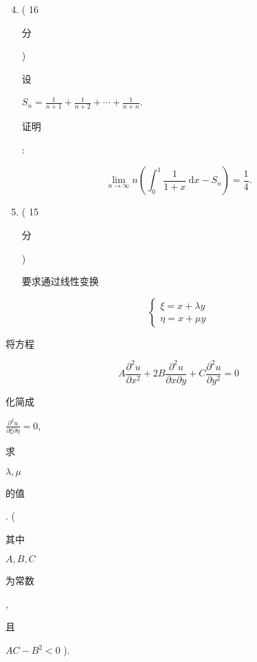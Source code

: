 \documentclass[10pt]{article}
\begin{document}
\begin{enumerate}
  \setcounter{enumi}{3}
  \item ( 16 \begin{CJK}{UTF8}{mj}分\end{CJK}) \begin{CJK}{UTF8}{mj}设\end{CJK} $S_{n}=\frac{1}{n+1}+\frac{1}{n+2}+\cdots+\frac{1}{n+n}$. \begin{CJK}{UTF8}{mj}证明\end{CJK}:
\end{enumerate}
$$
\lim _{n \rightarrow \infty} n\left(\int_{0}^{1} \frac{1}{1+x} \mathrm{~d} x-S_{n}\right)=\frac{1}{4} .
$$

\begin{enumerate}
  \setcounter{enumi}{4}
  \item ( 15 \begin{CJK}{UTF8}{mj}分\end{CJK}) \begin{CJK}{UTF8}{mj}要求通过线性变换\end{CJK}
\end{enumerate}
$$
\left\{\begin{array}{l}
\xi=x+\lambda y \\
\eta=x+\mu y
\end{array}\right.
$$
\begin{CJK}{UTF8}{mj}将方程\end{CJK}
$$
A \frac{\partial^{2} u}{\partial x^{2}}+2 B \frac{\partial^{2} u}{\partial x \partial y}+C \frac{\partial^{2} u}{\partial y^{2}}=0
$$
\begin{CJK}{UTF8}{mj}化简成\end{CJK} $\frac{\partial^{2} u}{\partial \xi \partial \eta}=0$, \begin{CJK}{UTF8}{mj}求\end{CJK} $\lambda, \mu$ \begin{CJK}{UTF8}{mj}的值\end{CJK}. (\begin{CJK}{UTF8}{mj}其中\end{CJK} $A, B, C$ \begin{CJK}{UTF8}{mj}为常数\end{CJK}, \begin{CJK}{UTF8}{mj}且\end{CJK} $A C-B^{2}<0$ ).
\end{document}
